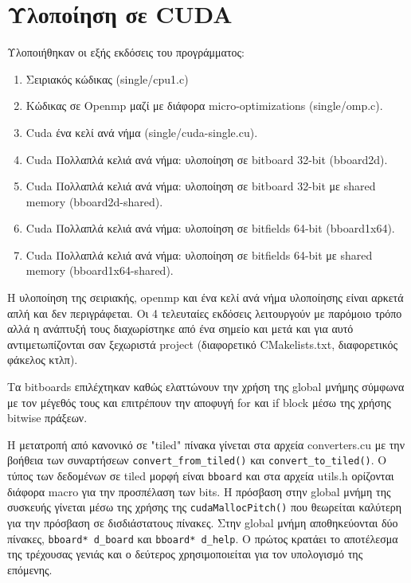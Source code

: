 \chapter{Υλοποίηση σε CUDA}

Υλοποιήθηκαν οι εξής εκδόσεις του προγράμματος:

\begin{enumerate}
\item Σειριακός κώδικας (single/cpu1.c)
\item Κώδικας σε Openmp μαζί με διάφορα micro-optimizations (single/omp.c).
\item Cuda ένα κελί ανά νήμα (single/cuda-single.cu).
\item Cuda Πολλαπλά κελιά ανά νήμα: υλοποίηση σε bitboard 32-bit (bboard2d).
\item Cuda Πολλαπλά κελιά ανά νήμα: υλοποίηση σε bitboard 32-bit με shared memory (bboard2d-shared).
\item Cuda Πολλαπλά κελιά ανά νήμα: υλοποίηση σε bitfields 64-bit (bboard1x64).
\item Cuda Πολλαπλά κελιά ανά νήμα: υλοποίηση σε bitfields 64-bit με shared memory (bboard1x64-shared).
\end{enumerate}

Η υλοποίηση της σειριακής, openmp και ένα κελί ανά νήμα υλοποίησης είναι αρκετά απλή και δεν
περιγράφεται. Οι 4 τελευταίες εκδόσεις λειτουργούν με παρόμοιο τρόπο αλλά
η ανάπτυξή τους διαχωρίστηκε από ένα σημείο και μετά
και για αυτό αντιμετωπίζονται σαν ξεχωριστά project
(διαφορετικό CMakelists.txt, διαφορετικός φάκελος κτλπ).

Τα bitboards επιλέχτηκαν καθώς ελαττώνουν την χρήση της global μνήμης σύμφωνα με τον μέγεθός τους
και επιτρέπουν την αποφυγή for και if block μέσω της χρήσης bitwise πράξεων.

\begin{sloppypar}
Η μετατροπή από κανονικό σε "tiled" πίνακα γίνεται στα αρχεία converters.cu
με την βοήθεια των συναρτήσεων \lstinline!convert_from_tiled()!
και \lstinline!convert_to_tiled()!.
Ο τύπος των δεδομένων σε tiled μορφή είναι \lstinline!bboard!
και στα αρχεία utils.h ορίζονται διάφορα macro για την προσπέλαση των bits.
Η πρόσβαση στην global μνήμη της συσκευής γίνεται μέσω της χρήσης της \lstinline!cudaMallocPitch()!
που θεωρείται καλύτερη για την πρόσβαση σε δισδιάστατους πίνακες.
Στην global μνήμη αποθηκεύονται δύο πίνακες,
\lstinline!bboard* d_board! και
\lstinline!bboard* d_help!.
Ο πρώτος κρατάει το αποτέλεσμα της τρέχουσας γενιάς
και ο δεύτερος χρησιμοποιείται για τον υπολογισμό της επόμενης.
\end{sloppypar}

